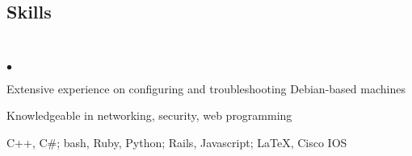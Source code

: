\documentclass[margin,line]{res}
\newenvironment{list2}
  {\vspace{-4mm}
   \begin{list}{$\bullet$}{
     \setlength{\itemsep}{0in}
     \setlength{\parsep}{0in} \setlength{\parskip}{0in}
     \setlength{\topsep}{0in} \setlength{\partopsep}{0in}
     \setlength{\leftmargin}{0.18in}}}
  {\end{list}}
\begin{document}
\begin{resume}
%
%
\section{\sc Skills} 
\textcolor{white}{.}
\begin{list2}
\item Extensive experience on configuring and troubleshooting Debian-based machines
\item Knowledgeable in networking, security, web programming
\item C++, C\#; bash, Ruby, Python; Rails, Javascript; \LaTeX, Cisco IOS
\end{list2}


%
%



%
%


\end{resume}
\end{document}
